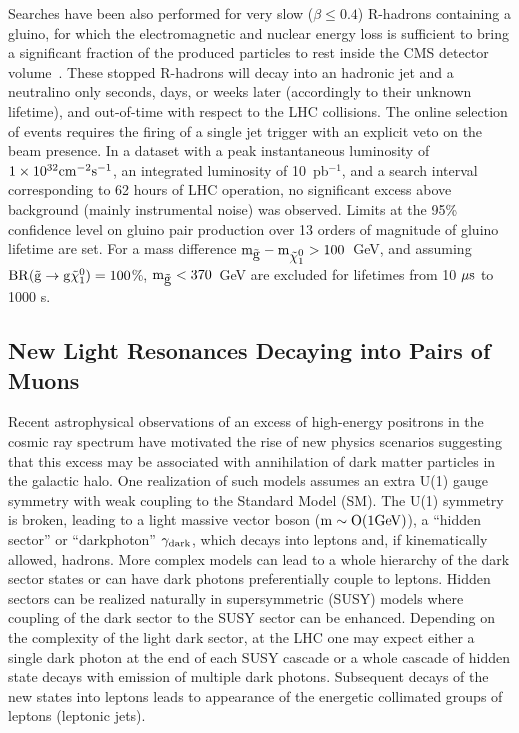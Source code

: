\documentclass[11pt]{article}
\def\pb{pb$^{-1}$\xspace}
\def\gluino{$\tilde{\rm{g}}$\xspace}
\def\neutralino{$\tilde{\chi}^{0}_{1}$\xspace}
\begin{document}
Searches have been also performed for very slow ($\beta \le 0.4$) R-hadrons containing a gluino, 
for which the electromagnetic and nuclear energy loss is sufficient to bring a significant fraction 
of the produced particles to rest inside the CMS detector volume~\cite{PhysRevLett.106.011801}. 
These stopped R-hadrons will decay into an hadronic jet and a neutralino only seconds, days, or 
weeks later (accordingly to their unknown lifetime), and out-of-time with respect to the LHC collisions. 
The online selection of events requires the firing of a single jet trigger with an explicit veto on the beam presence.
In a dataset with a peak instantaneous luminosity of $1\times 10^{32}\rm{ cm}^{-2}\rm{s}^{-1}$, 
an integrated luminosity of 10~\pb, and a search interval corresponding to 62 hours of LHC operation, 
no significant excess above background (mainly instrumental noise) was observed.  
Limits at the 95\% confidence level on gluino pair production over 13 orders of magnitude of gluino lifetime 
are set. For a mass difference $\rm{m}_{\mbox{\gluino}} - \rm{m}_{\mbox{\neutralino}} > 100$~GeV, and assuming 
$\rm{BR}( \mbox{\gluino} \rightarrow \rm{g} \mbox{\neutralino} ) = 100$\%, $\rm{m}_{\mbox{\gluino}}<370$~GeV 
are excluded for lifetimes from 10 $\mu\rm{s}$ to 1000 s.

\subsection{New Light Resonances Decaying into Pairs of Muons}

Recent astrophysical observations of an excess of high-energy positrons in the cosmic ray 
spectrum have motivated the rise of new physics scenarios suggesting that this excess may 
be associated with annihilation of dark matter particles in the galactic halo.
One realization of such models assumes an extra U(1) gauge symmetry with weak coupling to the 
Standard Model (SM). The U(1) symmetry is broken, leading to a light massive vector boson 
($\rm{m} \sim O(1 \rm{ GeV})$), a ``hidden sector'' or ``darkphoton'' $\gamma_{\rm{dark}}$, 
which decays into leptons and, if kinematically allowed, hadrons. 
More complex models can lead to a whole hierarchy of the dark sector states or can have 
dark photons preferentially couple to leptons. Hidden sectors can be realized naturally 
in supersymmetric (SUSY) models where coupling of the dark sector to the SUSY sector 
can be enhanced. Depending on the complexity of the light dark sector, at the LHC one may 
expect either a single dark photon at the end of each SUSY cascade or a whole cascade 
of hidden state decays with emission of multiple dark photons. Subsequent decays of the new 
states into leptons leads to appearance of the energetic collimated groups of leptons
(leptonic jets). 
 
\end{document}
